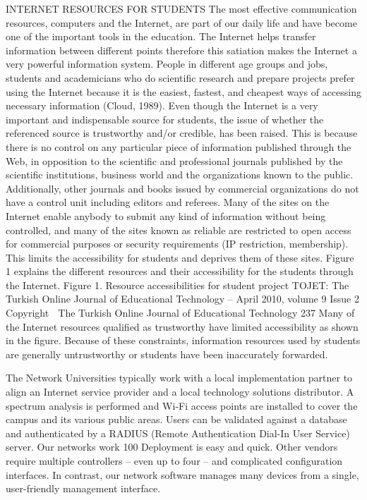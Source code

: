﻿\documentclass[10]{article}
\begin{document}
INTERNET RESOURCES FOR STUDENTS
The most effective communication resources, computers and the Internet, are part of our daily life and have become one of the important tools in the education. The Internet helps transfer information between different points therefore this satiation makes the Internet a very powerful information system. People in different age groups and jobs, students and academicians who do scientific research and prepare projects prefer using the Internet because it is the easiest, fastest, and cheapest ways of accessing necessary information (Cloud, 1989). Even though the Internet is a very important and indispensable source for students, the issue of whether the referenced source is trustworthy and/or credible, has been raised. This is because there is no control on any particular piece of information published through the Web, in opposition to the scientific and professional journals published by the scientific institutions, business world and the organizations known to the public. Additionally, other journals and books issued by commercial organizations do not have a control unit including editors and referees. Many of the sites on the Internet enable anybody to submit any kind of information without being controlled, and many of the sites known as reliable are restricted to open access for commercial purposes or security requirements (IP restriction, membership). This limits the accessibility for students and deprives them of these sites. Figure 1 explains the different resources and their accessibility for the students through the Internet. Figure 1. Resource accessibilities for student project TOJET: The Turkish Online Journal of Educational Technology – April 2010, volume 9 Issue 2 Copyright  The Turkish Online Journal of Educational Technology 237 Many of the Internet resources qualified as trustworthy have limited accessibility as shown in the figure. Because of these constraints, information resources used by students are generally untrustworthy or students have been inaccurately forwarded.

The Network
Universities typically work with a local implementation partner to align an Internet service provider and a local technology solutions distributor. A spectrum analysis is performed and Wi-Fi access points are installed to cover the campus and its various public areas.
Users can be validated against a database and authenticated by a RADIUS (Remote Authentication Dial-In User Service) server. Our networks work 100%
Deployment is easy and quick. Other vendors require multiple controllers – even up to four – and complicated configuration interfaces. In contrast, our network software manages many devices from a single, user-friendly management interface.
\end{document}
